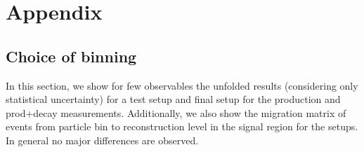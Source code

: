 
\chapter{Appendix} %
\label{AppendixA} %

\section{Choice of binning}
\label{sec:binning_optimization_study}

In this section, we show for few observables the unfolded results (considering only statistical uncertainty)
for a test setup and final setup for the \tty production and \tty prod+decay measurements. Additionally, we also show the migration matrix of events
from particle bin to reconstruction level in the signal region for the setups. In general no major differences are observed.

